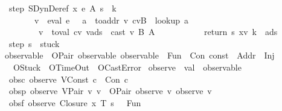 \begin{isabellebody}
\ \ {\isachardoublequoteopen}step\ {\isacharparenleft}SDynDeref\ x\ e\ A\ s{\isacharcomma}\ {\isasymrho}{\isacharcomma}\ k{\isacharcomma}\ {\isasymmu}{\isacharcomma}\ {\isacharbrackleft}{\isacharbrackright}{\isacharparenright}\ {\isacharequal}\isanewline
\ \ \ \ \ \ \ \ {\isacharparenleft}v\ {\isacharcolon}{\isacharequal}\ eval\ e\ {\isasymrho}\ {\isasymmu}{\isacharsemicolon}\ a\ {\isacharcolon}{\isacharequal}\ to{\isacharunderscore}addr\ v{\isacharsemicolon}\ {\isacharparenleft}cv{\isacharcomma}B{\isacharparenright}\ {\isacharcolon}{\isacharequal}\ lookup\ a\ {\isasymmu}{\isacharsemicolon}\isanewline
\ \ \ \ \ \ \ \ \ v{}\ {\isacharcolon}{\isacharequal}\ to{\isacharunderscore}val\ cv{\isacharsemicolon}\ {\isacharparenleft}v{}{\isacharcomma}{\isasymmu}{\isacharprime}{\isacharcomma}ads{\isacharparenright}\ {\isacharcolon}{\isacharequal}\ cast\ v{}\ B\ A\ {\isasymmu}\ {\isacharbrackleft}{\isacharbrackright}{\isacharsemicolon}\isanewline
\ \ \ \ \ \ \ \ \ return\ {\isacharparenleft}s{\isacharcomma}\ {\isacharparenleft}x{\isacharcomma}v{}{\isacharparenright}{\isacharhash}{\isasymrho}{\isacharcomma}\ k{\isacharcomma}\ {\isasymmu}{\isacharprime}{\isacharcomma}\ ads{\isacharparenright}{\isacharparenright}{\isachardoublequoteclose}\ {\isacharbar}\isanewline
\ \ {\isachardoublequoteopen}step\ s\ {\isacharequal}\ stuck{\isachardoublequoteclose}\isanewline
\isanewline
{}\isamarkupfalse \ observable\ {\isacharequal}\ OPair\ observable\ observable\ {\isacharbar}\ Fun\ {\isacharbar}\ Con\ const\ {\isacharbar}\ Addr\ {\isacharbar}\ Inj\isanewline
\ \ {\isacharbar}\ OStuck\ {\isacharbar}\ OTimeOut\ {\isacharbar}\ OCastError\isanewline
\isanewline
{}\isamarkupfalse \ observe\ {\isacharcolon}{\isacharcolon}\ {\isachardoublequoteopen}val\ {\isasymRightarrow}\ observable{\isachardoublequoteclose}\ \isanewline
\ \ obsc{\isacharcolon}\ {\isachardoublequoteopen}observe\ {\isacharparenleft}VConst\ c{\isacharparenright}\ {\isacharequal}\ Con\ c{\isachardoublequoteclose}\ {\isacharbar}\isanewline
\ \ obsp{\isacharcolon}\ {\isachardoublequoteopen}observe\ {\isacharparenleft}VPair\ v\ v{\isacharprime}{\isacharparenright}\ {\isacharequal}\ OPair\ {\isacharparenleft}observe\ v{\isacharparenright}\ {\isacharparenleft}observe\ v{\isacharprime}{\isacharparenright}{\isachardoublequoteclose}\ {\isacharbar}\isanewline
\ \ obsf{\isacharcolon}\ {\isachardoublequoteopen}observe\ {\isacharparenleft}Closure\ x\ T\ s\ {\isasymrho}{\isacharparenright}\ {\isacharequal}\ Fun{\isachardoublequoteclose}\ {\isacharbar}\isanewline

\end{isabellebody}
